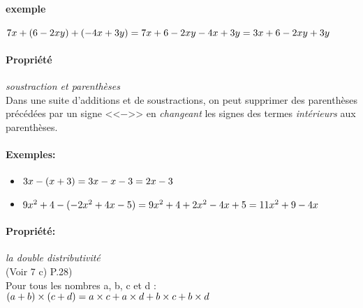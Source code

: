 \documentclass[
	a4paper,
	twocolumn=false,
	12pts,
	DIV=calc]%
	{article}
\begin{document}
\paragraph{exemple} 
\begin{math}
7x + (6-2xy)+(-4x+3y)\\
= 7x+6-2xy-4x+3y\\
= 3x+6-2xy+3y
\end{math}

\paragraph{Propriété}\emph{soustraction et parenthèses}\\
Dans une suite d'additions et de soustractions, on peut supprimer des parenthèses précédées par un signe <<$-$>> en \emph{changeant} les signes des termes \emph{intérieurs} aux parenthèses.

\paragraph{Exemples:}
\begin{itemize}
	\item
		\begin{math}
		3x-(x+3) \\
		= 3x-x-3 \\
		= 2x-3
		\end{math}
	\item
		\begin{math}
		9x^2+4-(-2x^2+4x-5) \\
		= 9x^2+4+2x^2-4x+5 \\
		= 11x^2+9-4x
		\end{math}
\end{itemize}

\paragraph{Propriété:}\emph{la double distributivité}\\
(Voir 7 c) P.28)\\
Pour tous les nombres a, b, c et d :\\
	\begin{math}
	(a+b) \times (c+d) \\
	= a \times c + a \times d + b\times c + b\times d
	\end{math}
\end{document}
